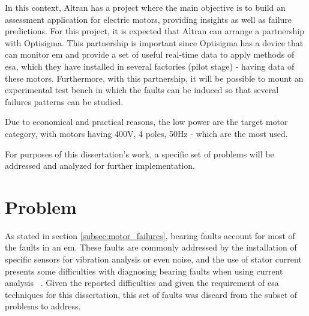 In this context, Altran has a project where the main objective is to build an assessment application for electric motors, providing insights as well as failure predictions. For this project, it is expected that Altran can arrange a partnership with Optisigma. This partnership is important since Optisigma has a device that can monitor \acrlong{em} and provide a set of useful real-time data to apply methods of \acrfull{esa}, which they have installed in several factories (pilot stage) - having data of these motors. Furthermore, with this partnership, it will be possible to mount an experimental test bench in which the faults can be induced so that several failures patterns can be studied. 

Due to economical and practical reasons, the low power  are the target motor category, with motors having 400V, 4 poles, 50Hz - which are the most used.

For purposes of this dissertation's work, a specific set of problems will be addressed and analyzed for further implementation.





\section{Problem} %
\label{sec:problem}

As stated in section \ref{subsec:motor_failures}, bearing faults account for most of the faults in an \acrlong{em}. These faults are commonly addressed by the installation of specific sensors for vibration analysis or even noise, and the use of stator current presents some difficulties with diagnosing bearing faults when using current analysis ~\cite{Riera-Guasp2015}.  Given the reported difficulties and given the requirement of \Acrshort{esa} techniques for this dissertation, this set of faults was discard from the subset of problems to address.

